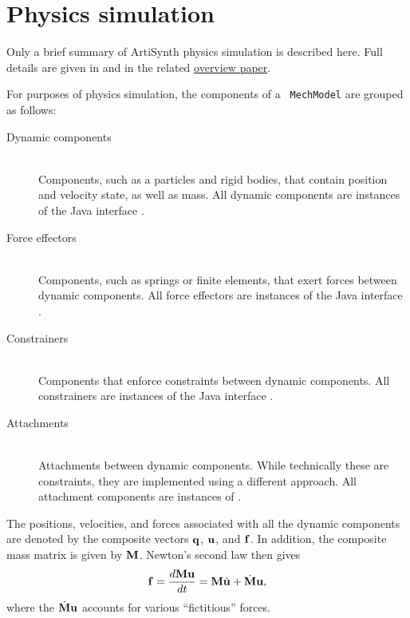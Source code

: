 \section{Physics simulation}
\label{PhysicsSimulation:sec}

Only a brief summary of ArtiSynth physics simulation is described
here.  Full details are given in \cite{lloyd2012artisynth} and in the
related
\href{http://www.artisynth.org/doc/artisynth.pdf}{overview paper}.

For purposes of physics simulation, the components of a {\tt
MechModel} are grouped as follows:

\begin{description}
	
\item[Dynamic components] \mbox{}\hfill\\ Components, such as a
particles and rigid bodies, that contain position and velocity state,
as well as mass. All dynamic components are instances of
the Java interface
.

\item[Force effectors] \mbox{}\hfill\\
Components, such as springs or finite elements,
that exert forces between dynamic components.
All force effectors are instances of the Java interface
.

\item[Constrainers] \mbox{}\hfill\\
Components that enforce constraints between dynamic components. 
All constrainers are instances of the Java interface
.

\item[Attachments] \mbox{}\hfill\\
Attachments between dynamic components. While technically these
are constraints, they are implemented using a different approach.
All attachment components are instances of
.

\end{description}

The positions, velocities, and forces associated with all the
dynamic components are denoted by the composite vectors 
${\bf q}$, ${\bf u}$, and ${\bf f}$. 
In addition, the composite mass matrix is given by
${\bf M}$. 
Newton's second law then gives
\begin{equation}
{\bf f} = \frac{d {\bf M} {\bf u}}{d t} = {\bf M} \dot{{\bf u}} + \dot{{\bf M}} {\bf u},
\label{newton:eqn}
\end{equation}
%
where the $\dot{{\bf M}} {\bf u}$ accounts for various ``fictitious'' forces.

